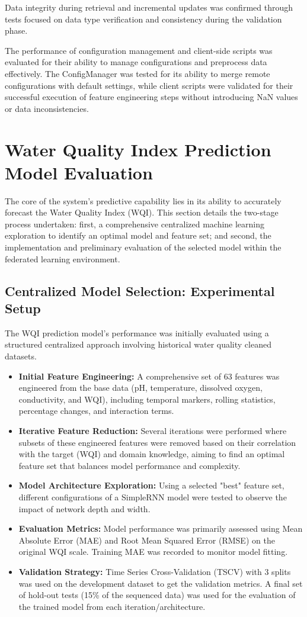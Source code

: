 Data integrity during retrieval and incremental updates was confirmed through tests focused on data type verification and consistency during the validation phase.

The performance of configuration management and client-side scripts was evaluated for their ability to manage configurations and preprocess data effectively. The ConfigManager was tested for its ability to merge remote configurations with default settings, while client scripts were validated for their successful execution of feature engineering steps without introducing NaN values or data inconsistencies.
 
\section{Water Quality Index Prediction Model Evaluation}
\label{sec:wqi_model_evaluation}
The core of the system's predictive capability lies in its ability to accurately forecast the Water Quality Index (WQI). This section details the two-stage process undertaken: first, a comprehensive centralized machine learning exploration to identify an optimal model and feature set; and second, the implementation and preliminary evaluation of the selected model within the federated learning environment.
\subsection{Centralized Model Selection: Experimental Setup}
\label{ssec:centralized_setup}
The WQI prediction model's performance was initially evaluated using a structured centralized approach involving historical water quality cleaned datasets.
\begin{itemize}
\item \textbf{Initial Feature Engineering:} A comprehensive set of 63 features was engineered from the base data (pH, temperature, dissolved oxygen, conductivity, and WQI), including temporal markers, rolling statistics, percentage changes, and interaction terms.
\item \textbf{Iterative Feature Reduction:} Several iterations were performed where subsets of these engineered features were removed based on their correlation with the target (WQI) and domain knowledge, aiming to find an optimal feature set that balances model performance and complexity.
\item \textbf{Model Architecture Exploration:} Using a selected "best" feature set, different configurations of a SimpleRNN model were tested to observe the impact of network depth and width.
\item \textbf{Evaluation Metrics:} Model performance was primarily assessed using Mean Absolute Error (MAE) and Root Mean Squared Error (RMSE) on the original WQI scale. Training MAE was recorded to monitor model fitting.
\item \textbf{Validation Strategy:} Time Series Cross-Validation (TSCV) with 3 splits was used on the development dataset to get the validation metrics. A final set of hold-out tests (15\% of the sequenced data) was used for the evaluation of the trained model from each iteration/architecture.
\end{itemize}
